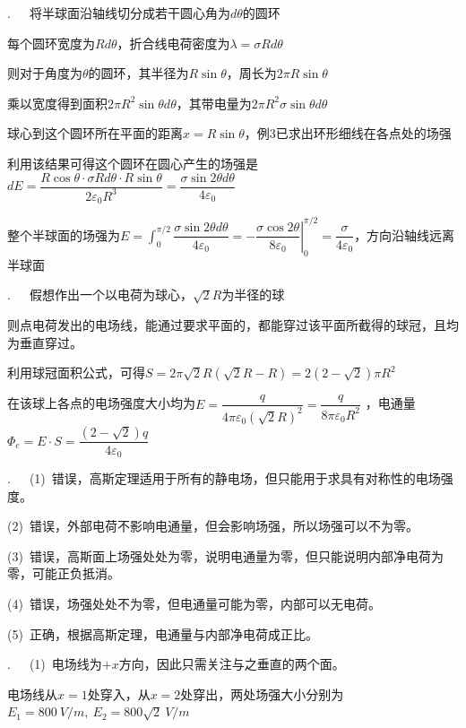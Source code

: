 .~~~将半球面沿轴线切分成若干圆心角为$d\theta$的圆环

每个圆环宽度为$Rd\theta$，折合线电荷密度为$\lambda=\sigma Rd\theta$

则对于角度为$\theta$的圆环，其半径为$R\sin{\theta}$，周长为$2\pi R\sin{\theta}$

乘以宽度得到面积$2\pi R^2\sin{\theta}d\theta$，其带电量为$2\pi R^2\sigma \sin{\theta}d\theta$

球心到这个圆环所在平面的距离$x=R\sin\theta$，例3已求出环形细线在各点处的场强

利用该结果可得这个圆环在圆心产生的场强是$dE=\dfrac{R\cos\theta \cdot \sigma Rd\theta\cdot R\sin\theta}{2\varepsilon_0 R^3}=\dfrac{\sigma\sin2\theta d\theta }{4\varepsilon_0}$ 

整个半球面的场强为$E=\displaystyle\int_0^{\pi/2}{\dfrac{\sigma\sin2\theta d\theta}{4\varepsilon_0}}=-\left.\dfrac{\sigma\cos 2\theta}{8\varepsilon_0}\right|_0^{\pi/2}=\dfrac{\sigma}{4\varepsilon_0}$，方向沿轴线远离半球面

\newpage

.~~~假想作出一个以电荷为球心，$\sqrt{2}R$为半径的球

则点电荷发出的电场线，能通过要求平面的，都能穿过该平面所截得的球冠，且均为垂直穿过。

利用球冠面积公式，可得$S=2\pi \sqrt{2}R (\sqrt{2}R-R)=2(2-\sqrt{2})\pi R^2$

在该球上各点的电场强度大小均为$E=\dfrac{q}{4\pi\varepsilon_0 (\sqrt{2}R)^2}=\dfrac{q}{8\pi\varepsilon_0 R^2}$
，电通量$\Phi_e=E\cdot S=\dfrac{(2-\sqrt{2}) q}{4\varepsilon_0}$

\noindent\hdashrule{\textwidth}{1pt}{1pt}

.~~~(1)~错误，高斯定理适用于所有的静电场，但只能用于求具有对称性的电场强度。

(2)~错误，外部电荷不影响电通量，但会影响场强，所以场强可以不为零。

(3)~错误，高斯面上场强处处为零，说明电通量为零，但只能说明内部净电荷为零，可能正负抵消。

(4)~错误，场强处处不为零，但电通量可能为零，内部可以无电荷。

(5)~正确，根据高斯定理，电通量与内部净电荷成正比。

\noindent\hdashrule{\textwidth}{1pt}{1pt}

.~~~(1)~电场线为$+x$方向，因此只需关注与之垂直的两个面。

电场线从$x=1$处穿入，从$x=2$处穿出，两处场强大小分别为$E_1=800~\unit{V/m},~E_2=800\sqrt{2}~\unit{V/m}$

